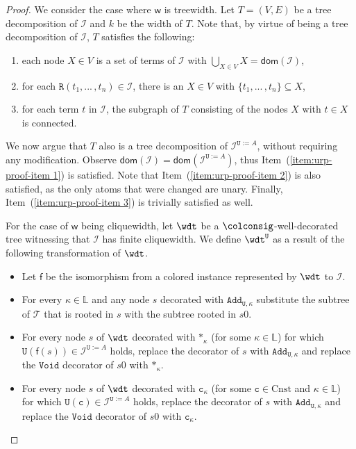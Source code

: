 \documentclass[10pt,a4paper]{amsart}
\theoremstyle{definition}
\numberwithin{equation}{section}
\theoremstyle{plain}
\theoremstyle{definition}
\theoremstyle{myexample}
\theoremstyle{plain}
\theoremstyle{definition}
\newcommand{\instance}{\mathcal{I}}
\newcommand{\inst}{\instance}
\newcommand{\adom}[1]{\fcn{dom}(#1)}
\newcommand{\cols}{\mathbb{L}}
\newcommand{\fcn}[1]{\mathsf{#1}}
\newcommand{\pred}[1]{\mathtt{#1}}
\newcommand{\rpred}{\pred{R}}
\begin{document}
\begin{proof}
We consider the case where $\fcn{w}$ is treewidth. Let $T = (V,E)$ be a tree decomposition of $\inst$ and $k$ be the width of $T$. Note that, by virtue of being a tree decomposition of $\inst$, $T$ satisfies the following:
\begin{enumerate}
	\item\label{item:urp-proof-item 1} each node $X \in V$ is a set of terms of $\inst$ with $\bigcup_{X \in V} X = \adom{\inst}$,
	\item\label{item:urp-proof-item 2} for each $\rpred(t_{1}, ...\,,t_{n}) \in \inst$, there is an $X \in V$ with $\{t_{1}, ...\,,t_{n}\} \subseteq X$,
	\item\label{item:urp-proof-item 3} for each term $t$ in $\inst$, the subgraph of $T$ consisting of the nodes $X$ with $t \in X$ is connected.
\end{enumerate}
We now argue that $T$ also is a tree de\-com\-po\-si\-tion of $\inst^{\pred{U}:=A}$, without requiring any modification.
Observe $\adom{\inst} = \adom{\inst^{\pred{U}:=A}}$, thus Item~(\ref{item:urp-proof-item 1}) is satisfied. Note that Item~(\ref{item:urp-proof-item 2}) is also satisfied, as the only atoms that were changed are unary. Finally, Item~(\ref{item:urp-proof-item 3}) is trivially satisfied as well.


\bigskip
For the case of $\fcn{w}$ being cliquewidth, let $\wdt$ be a $\colconsig$-well-decorated tree witnessing that $\inst$ has finite cliquewidth. We define $\wdt^{\pred{U}}$ as a result of the following transformation of $\wdt$.
\begin{itemize}
	\item Let $\fcn{f}$ be the isomorphism from a colored instance represented by $\wdt$ to $\inst$.
	
	\item For every $\kappa \in \cols$ and any node $s$ decorated with $\pred{Add}_{\pred{U}, \kappa}$ substitute the subtree of $\mathcal T$ that is rooted in $s$ with the subtree rooted in $s0$.
	
	\item For every node $s$ of $\wdt$ decorated with $\pred{*}_\kappa$ (for some $\kappa \in \cols$) for which $\pred{U}(\fcn{f}(s)) \in \inst^{\pred{U}:=A}$ holds, replace the decorator of $s$ with $\pred{Add}_{\pred{U}, \kappa}$ and replace the $\pred{Void}$ decorator of $s0$ with $\pred{*}_\kappa$.
	
	\item For every node $s$ of $\wdt$ decorated with $\pred{c}_\kappa$ (for some $\pred{c} \in \mathrm{Cnst}$ and $\kappa \in \cols$) for which $\pred{U}(\pred{c}) \in \inst^{\pred{U}:=A}$ holds, replace the decorator of $s$ with $\pred{Add}_{\pred{U}, \kappa}$ and replace the $\pred{Void}$ decorator of $s0$ with $\pred{c}_\kappa$.
\end{itemize}


\end{proof}
\end{document}
